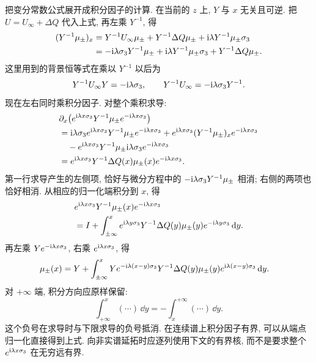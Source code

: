 \par\medskip\noindent 把变分常数公式展开成积分因子的计算.\quad
在当前的 $z$ 上, $Y$ 与 $x$ 无关且可逆. 把
$U=U_\infty+\Delta Q$ 代入上式, 再左乘 $Y^{-1}$, 得
\begin{align*}
(Y^{-1}\mu_\pm)_x
&=Y^{-1}U_\infty\mu_\pm
+Y^{-1}\Delta Q\mu_\pm
+\mathrm{i}\lambda Y^{-1}\mu_\pm\sigma_3\\
&=-\mathrm{i}\lambda\sigma_3 Y^{-1}\mu_\pm
+\mathrm{i}\lambda Y^{-1}\mu_\pm\sigma_3
+Y^{-1}\Delta Q\mu_\pm.
\end{align*}
这里用到的背景恒等式在乘以 $Y^{-1}$ 以后为
\begin{equation*}
Y^{-1}U_\infty Y=-\mathrm{i}\lambda\sigma_3,
\qquad
Y^{-1}U_\infty=-\mathrm{i}\lambda\sigma_3 Y^{-1}.
\end{equation*}
现在左右同时乘积分因子. 对整个乘积求导:
\begin{align*}
&\partial_x\bigl(e^{\mathrm{i}\lambda x\sigma_3}Y^{-1}\mu_\pm
 e^{-\mathrm{i}\lambda x\sigma_3}\bigr)\\
&=\mathrm{i}\lambda\sigma_3 e^{\mathrm{i}\lambda x\sigma_3}Y^{-1}\mu_\pm
 e^{-\mathrm{i}\lambda x\sigma_3}
+e^{\mathrm{i}\lambda x\sigma_3}(Y^{-1}\mu_\pm)_x
 e^{-\mathrm{i}\lambda x\sigma_3}\\
&\quad-e^{\mathrm{i}\lambda x\sigma_3}Y^{-1}\mu_\pm
 \mathrm{i}\lambda\sigma_3 e^{-\mathrm{i}\lambda x\sigma_3}\\
&=e^{\mathrm{i}\lambda x\sigma_3}Y^{-1}\Delta Q(x)\mu_\pm(x)
 e^{-\mathrm{i}\lambda x\sigma_3}.
\end{align*}
第一行求导产生的左侧项, 恰好与微分方程中的
$-\mathrm{i}\lambda\sigma_3 Y^{-1}\mu_\pm$ 相消;
右侧的两项也恰好相消. 从相应的归一化端积分到 $x$, 得
\begin{align*}
&e^{\mathrm{i}\lambda x\sigma_3}Y^{-1}\mu_\pm(x)e^{-\mathrm{i}\lambda x\sigma_3}\\
&=I+\int_{\pm\infty}^{x}
 e^{\mathrm{i}\lambda y\sigma_3}Y^{-1}\Delta Q(y)\mu_\pm(y)
 e^{-\mathrm{i}\lambda y\sigma_3}\,\mathrm{d} y.
\end{align*}
再左乘 $Ye^{-\mathrm{i}\lambda x\sigma_3}$, 右乘
$e^{\mathrm{i}\lambda x\sigma_3}$, 得
\begin{align*}
\mu_\pm(x)
&=Y+\int_{\pm\infty}^{x}
 Ye^{-\mathrm{i}\lambda(x-y)\sigma_3}Y^{-1}
 \Delta Q(y)\mu_\pm(y)e^{\mathrm{i}\lambda(x-y)\sigma_3}\,\mathrm{d} y.
\end{align*}
对 $+\infty$ 端, 积分方向应原样保留:
\begin{equation*}
\int_{+\infty}^{x}(\cdots)\,\dd y
=-\int_x^{+\infty}(\cdots)\,\dd y.
\end{equation*}
这个负号在求导时与下限求导的负号抵消.
在连续谱上积分因子有界, 可以从端点归一化直接得到上式.
向非实谱延拓时应逐列使用下文的有界核, 而不是要求整个
$e^{\mathrm{i}\lambda x\sigma_3}$ 在无穷远有界.



